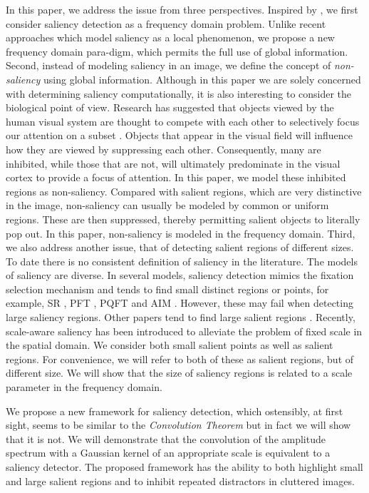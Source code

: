\documentclass[10pt,journal,cspaper,compsoc]{IEEEtran}
\begin{document}
In this paper, we address the issue from three perspectives. Inspired by \cite{hou2007saliency}, we first consider saliency detection as a frequency domain problem. Unlike recent approaches which model saliency as a local phenomenon, we propose a new frequency domain para-digm, which permits the full use of global information. Second, instead of modeling saliency in an image, we define the concept of {\it non-saliency} using global information. Although in this paper we are solely concerned with determining saliency  computationally, it is also interesting to consider the biological point of view. Research has suggested that objects viewed by the human visual system are thought to compete with each other to selectively focus our attention on a subset \cite{beck2005stimulus, yantis2005visual}. Objects that appear in the visual field will influence how they are viewed by suppressing each other. Consequently, many are inhibited, while those that are not, will ultimately predominate in the visual cortex to provide a focus of attention. In this paper, we model these inhibited regions as non-saliency. Compared with salient regions, which are very distinctive in the image, non-saliency can usually be modeled by common or uniform regions. These are then  suppressed,  thereby permitting salient objects to literally pop out. In this paper, non-saliency is modeled in the frequency domain. Third, we also address another issue, that of detecting salient regions of different sizes.
To date there is no consistent definition of saliency in the literature. The models of saliency are diverse. In several models, saliency detection mimics the fixation selection mechanism and tends to find small distinct regions or points, for example, SR \cite{hou2007saliency}, PFT \cite{guo2008spatio}, PQFT \cite{guo2010multiresolution} and AIM \cite{NIPS2005_81}. However, these may fail when detecting large saliency regions. Other papers tend to find large salient regions \cite{LCAV-CONF-2009-012, liu2010learning, goferman2010context, chengsaliency,yusaliencyregions, khan2009top}. Recently, scale-aware saliency \cite{Jacobson2010scale-aware} has been introduced to alleviate the problem of fixed scale in the spatial domain. We consider both small salient points as well as salient regions. For convenience, we will refer to both of these as salient regions, but of different size. We will show that the size of saliency regions is related to a scale parameter in the frequency domain.


We propose a new framework for saliency detection, which ostensibly, at first sight, seems to be similar to the {\it Convolution Theorem} but in fact we will show that it is not. We will demonstrate that the convolution of the amplitude spectrum with a Gaussian kernel of an appropriate scale is equivalent to a saliency detector. The proposed framework has the ability to both highlight small and large salient regions and to inhibit repeated distractors in cluttered images.
\end{document}
